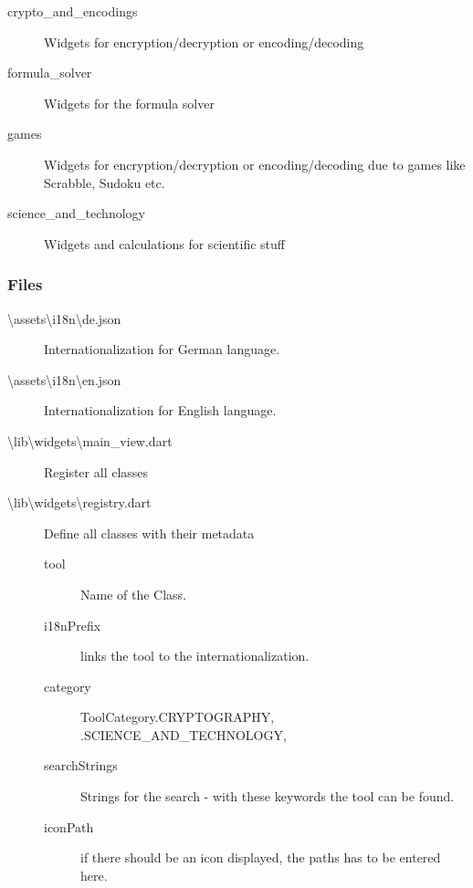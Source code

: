 \begin{description}
\begin{description}
\begin{description}
            \item[crypto\_and\_encodings] Widgets for encryption/decryption or encoding/decoding
            \item[formula\_solver] Widgets for the formula solver
            \item[games] Widgets for encryption/decryption or encoding/decoding due to games like Scrabble, Sudoku etc.
            \item[science\_and\_technology] Widgets and calculations for scientific stuff
        \end{description}
    \end{description}
\end{description}

\subsubsection{Files}
\begin{description}
    \item[\textbackslash assets\textbackslash i18n\textbackslash de.json] Internationalization for German language.
    \item[\textbackslash assets\textbackslash i18n\textbackslash en.json] Internationalization for English language.
    \item[\textbackslash lib\textbackslash widgets\textbackslash main\_view.dart] Register all classes
    \item[\textbackslash lib\textbackslash widgets\textbackslash registry.dart] Define all classes with their metadata
    \begin{description}
        \item[tool] Name of the Class.
        \item[i18nPrefix] links the tool to the internationalization.
        \item[category] ToolCategory.CRYPTOGRAPHY, .SCIENCE\_AND\_TECHNOLOGY,
        \item[searchStrings] Strings for the search - with these keywords the tool can be found.
        \item[iconPath] if there should be an icon displayed, the paths has to be entered here.
    \end{description}
\end{description}


